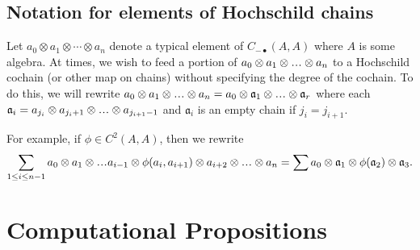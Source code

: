 \subsection{Notation for elements of Hochschild chains}
Let $a_0 \otimes a_1 \otimes \cdots \otimes a_n$ 
denote a typical element of $C_{-\bullet}(A,A)$ where 
$A$ is some algebra. At times, we wish to feed a portion 
of $a_0 \otimes a_1 \otimes \smdots \otimes a_n$ to a 
Hochschild cochain (or other map on chains) without 
specifying the degree of the cochain. To do this, 
we will rewrite $a_0 \otimes a_1 \otimes \smdots \otimes a_n 
= a_0 \otimes \mathfrak{a}_1 \otimes \smdots \otimes \mathfrak{a}_r$ 
where each $\mathfrak{a}_i = a_{j_i} \otimes a_{j_i+1} \otimes 
\smdots \otimes a_{j_{i+1}-1}$ and $\mathfrak{a}_i$ 
is an empty chain if $j_i = j_{i+1}$.

For example, if $\phi \in C^2(A,A)$, then we 
rewrite 
$$
\sum \limits_{1\leq i \leq n-1} 
a_0 \otimes a_1 \otimes \smdots a_{i-1} \otimes 
\phi(a_i, a_{i+1}) \otimes a_{i+2} \otimes \smdots \otimes a_n
=
\sum
a_0 \otimes \mathfrak{a}_1 \otimes \phi(\mathfrak{a}_2)
\otimes \mathfrak{a}_3.
$$

\section{Computational Propositions}




